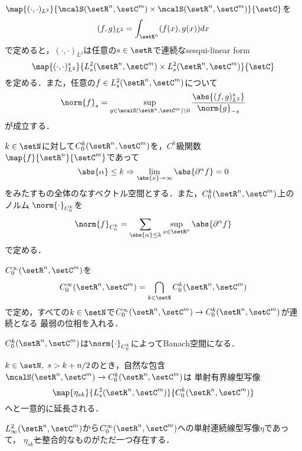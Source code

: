 \documentclass[uplatex,dvipdfmx]{jsarticle}
\newcommand{\sobolev}[1]{L^{2}_{#1}}
\newcommand{\sobolevlocal}[3]{\sobolev{#1}(\setR^{#2},\setC^{#3})}
\newcommand{\schwartz}[2]{\mcalS(\setR^{#1},\setC^{#2})}
\newcommand{\dd}{d} %
\providecommand{\DIFadd}[1]{{\protect\color{blue}\uwave{#1}}} %
\providecommand{\DIFdel}[1]{{\protect\color{red}\sout{#1}}}                      %
\providecommand{\DIFaddbegin}{} %
\providecommand{\DIFaddend}{} %
\providecommand{\DIFdelbegin}{} %
\providecommand{\DIFdelend}{} %
\begin{document}
\begin{proposition}
  $\map{(\cdot,\cdot)_{L^2}}{\schwartz{n}{m}\times\schwartz{n}{m}}{\setC}$を
  \[(f,g)_{L^2} = \int_{\setR^n} (f(x),g(x)) \dd x \]
  で定めると，$(\cdot,\cdot)_{L^2}$は任意の$s\in \setR$で連続なsesqui-linear form
  \[ \map{(\cdot,\cdot)^s_{L^2}}{\sobolevlocal{s}{n}{m}\times\sobolevlocal{s}{n}{m}}{\setC} \]
  を定める．また，任意の$f\in \sobolevlocal{s}{n}{m}$について
  \[ \norm{f}_s = \sup_{g\in \schwartz{n}{m}\setminus 0} \frac{\abs{(f,g)_{L^2}^s}}{\norm{g}_{-s}} \]
  が成立する．
\end{proposition}

\begin{definition}
  \begin{enumarabicp}
    \item $k\in \setN$に対して$C^k_0(\setR^n,\setC^m)$を，$C^k$級関数$\map{f}{\setR^n}{\setC^m}$であって
    \[ \abs{\alpha}\leq k \Rightarrow \lim_{\abs{x}\to \infty} \abs{\partial^\alpha f} = 0 \]
    をみたすもの全体のなすベクトル空間とする．また，$C^k_0(\setR^n,\setC^m)$上のノルム
    $\norm{\cdot}_{C^k_0}$を
    \[ \norm{f}_{C^k_0} = \sum_{\abs{\alpha}\leq k} \sup_{x\in \setR^n} \abs{\partial^\alpha f} \]
    で定める．
    \item $C^\infty_0(\setR^n,\setC^m)$を
    \[C^\infty_0(\setR^n,\setC^m) = \bigcap_{k\in \setN} C^k_0(\setR^n,\setC^m) \]
    で定め，すべての$k\in \setN$で$C^\infty_0(\setR^n,\setC^m)\to C^k_0(\setR^n,\setC^m)$が連続となる
    最弱の位相を入れる．
  \end{enumarabicp}
\end{definition}

\begin{proposition}
  $C^k_0(\setR^n,\setC^m)$は$\norm{\cdot}_{C^k_0}$によってBanach空間になる．
\end{proposition}

\begin{theorem}[Sobolevの埋め込み定理]\label{Sobolev embedding}
  $k\in \setN,\ s>k+n/2$のとき，自然な包含$\schwartz{n}{m}\to C^k_0(\setR^n,\setC^m)$は
  単射有界線型写像
  \[ \map{\eta_{sk}}{\sobolevlocal{s}{n}{m}}{C^k_0(\setR^n,\setC^m)}\]
  へと一意的に延長される．
\end{theorem}

\begin{corollary}
  $\sobolevlocal{\infty}{n}{m}$から$C^\infty_0(\setR^n,\setC^m)$への単射連続線型写像$\eta$であって，
  \DIFdelbegin \DIFdel{$\eta_{sk}$と}\DIFdelend \DIFaddbegin \DIFadd{$\eta_{sk}\ (s>k+n/2)$たちと}\DIFaddend 整合的なものがただ一つ存在する．
\end{corollary}
\end{document}
